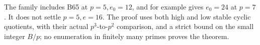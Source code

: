 \begin{remark}
\label{rem:B-RD66-scope}
The family includes B65 at $p=5,e_0=12$, and for example gives
$e_0=24$ at $p=7$. It does not settle $p=5,e=16$. The proof uses
both high and low stable cyclic quotients, with their actual
$p^3$-to-$p^2$ comparison, and a strict bound on the small integer
$B/p$; no enumeration in finitely many primes proves the theorem.
\end{remark}
